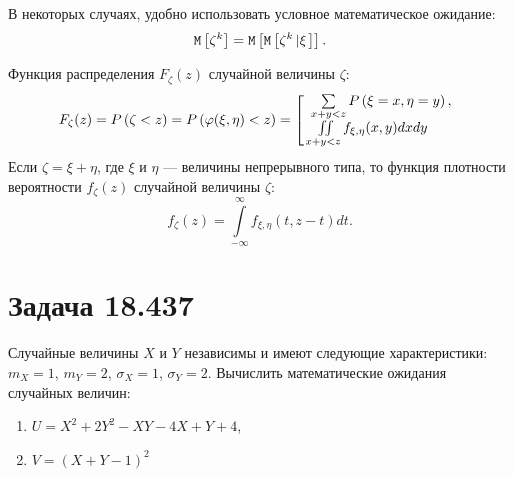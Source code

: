 В некоторых случаях, удобно использовать условное математическое ожидание:
\begin{equation}
    \mathtt{M} \left [ \zeta^k \right ]
    = \mathtt{M} \left [ \mathtt{M} \left [ \zeta^k \left | \xi \right . \right ] \right ] .
\end{equation}

Функция распределения $F_\zeta(z)$ случайной величины $\zeta$:
\begin{equation}
    F_{\zeta}(z)
    = P \left ( \zeta < z \right )
    = P \left ( \varphi(\xi, \eta) < z \right )
    = \left [
            \begin{array}{l}
                \sum \limits_{x + y < z} P \left ( \xi = x, \eta = y \right ) , \\
                \iint \limits_{x + y < z} f_{\xi, \eta}(x, y) dx dy
            \end{array}
    \right .
\end{equation}
Если $\zeta = \xi + \eta$, где $\xi$ и $\eta$ --- величины непрерывного типа, то функция плотности вероятности $f_\zeta(z)$ случайной величины $\zeta$:
\begin{equation}
    f_{\zeta}(z)
    = \int \limits_{-\infty}^{\infty} f_{\xi, \eta}(t, z-t) dt .
\end{equation}

\section*{Задача 18.437}

Случайные величины $X$ и $Y$ независимы и имеют следующие характеристики: $m_X = 1$, $m_Y = 2$, $\sigma_X = 1$, $\sigma_Y = 2$.
Вычислить математические ожидания случайных величин:
\begin{enumerate}
    \item $U = X^2 + 2 Y^2 - XY - 4X + Y + 4$,
    \item $V = (X + Y - 1)^2$
\end{enumerate}

